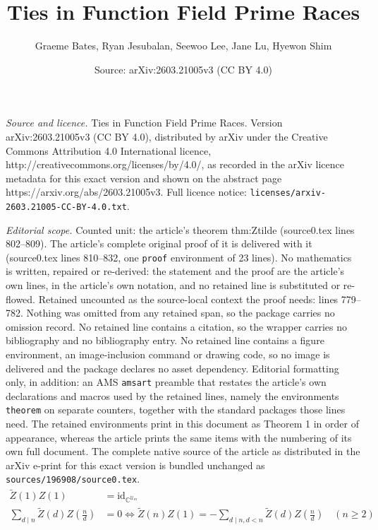 \documentclass[10pt,a4paper]{amsart}
\title{Ties in Function Field Prime Races}
\author{Graeme Bates, Ryan Jesubalan, Seewoo Lee, Jane Lu, Hyewon Shim}
\date{Source: arXiv:2603.21005v3 (CC BY 4.0)}
\newcommand{\bC}{\mathbb{C}}
\newcommand{\id}{\mathrm{id}}
\newcommand{\scU}{\mathscr{U}}
\begin{document}
\maketitle

\noindent\emph{Source and licence.} Ties in Function Field Prime Races. Version arXiv:2603.21005v3 (CC BY 4.0), distributed by arXiv under the Creative Commons Attribution 4.0 International licence, http://creativecommons.org/licenses/by/4.0/, as recorded in the arXiv licence metadata for this exact version and shown on the abstract page https://arxiv.org/abs/2603.21005v3. Full licence notice: \texttt{licenses/arxiv-2603.21005-CC-BY-4.0.txt}.\par\smallskip

\noindent\textit{Editorial scope.} Counted unit: the article's theorem thm:Ztilde (source0.tex lines 802--809). The article's complete original proof of it is delivered with it (source0.tex lines 810--832, one \texttt{proof} environment of 23 lines). No mathematics is written, repaired or re-derived: the statement and the proof are the article's own lines, in the article's own notation, and no retained line is substituted or re-flowed.  Retained uncounted as the source-local context the proof needs: lines 779--782.  Nothing was omitted from any retained span, so the package carries no omission record.  No retained line contains a citation, so the wrapper carries no bibliography and no bibliography entry.  No retained line contains a figure environment, an image-inclusion command or drawing code, so no image is delivered and the package declares no asset dependency.  Editorial formatting only, in addition: an AMS \texttt{amsart} preamble that restates the article's own declarations and macros used by the retained lines, namely the environments \texttt{theorem} on separate counters, together with the standard packages those lines need.  The retained environments print in this document as Theorem 1 in order of appearance, whereas the article prints the same items with the numbering of its own full document.  The complete native source of the article as distributed in the arXiv e-print for this exact version is bundled unchanged as \texttt{sources/196908/source0.tex}.
\begin{align}
    \widetilde{Z}(1) Z(1) &= \id_{\bC^{\scU_m}} \label{eqn:Ztilde_one} \\
    \sum_{d \mid n} \widetilde{Z}(d) Z\left(\frac{n}{d}\right) &= 0 \Leftrightarrow \widetilde{Z}(n) Z(1) = -\sum_{d \mid n, d < n} \widetilde{Z}(d) Z\left(\frac{n}{d}\right)\quad (n \ge 2) \label{eqn:Ztilde_rec}
\end{align}
\end{document}
